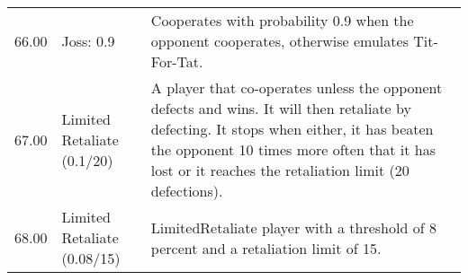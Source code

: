 \begin{tabular}{rll}
	66.00  & Joss: 0.9                   & Cooperates with probability 0.9 when the opponent cooperates, otherwise
	emulates Tit-For-Tat.                                                                                                                                                                                                                                                                                                                                                                                                                                                                                                                                                                                                                                                                                                                                                                                                                                                                                                                        \\
	67.00  & Limited Retaliate (0.1/20)  & A player that co-operates unless the opponent defects and wins.
	It will then retaliate by defecting. It stops when either, it has beaten
	the opponent 10 times more often that it has lost or it reaches the
	retaliation limit (20 defections).                                                                                                                                                                                                                                                                                                                                                                                                                                                                                                                                                                                                                                                                                                                                                              \\
	68.00  & Limited Retaliate (0.08/15) & LimitedRetaliate player with a threshold of 8 percent and a
	retaliation limit of 15.                                                                                                                                                                                                                                                                                                                                                                                                                                                                                                                                                                                                                                                                                                                                                                                                                                                                                                                                 \\

\end{tabular}
